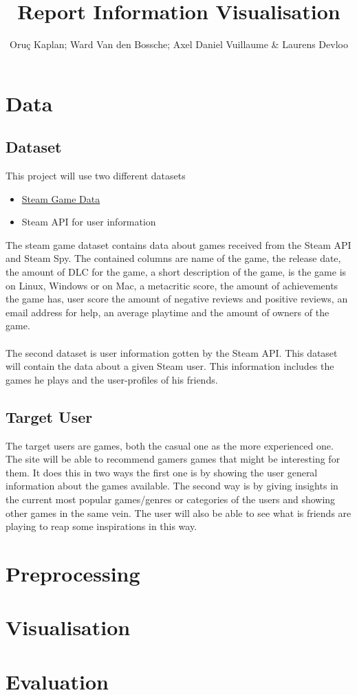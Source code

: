 \documentclass{article}
\begin{document}
	\title{Report Information Visualisation}
	\author{Oruç Kaplan; Ward Van den Bossche; Axel Daniel Vuillaume \& Laurens Devloo}
	\maketitle
	\tableofcontents
	\newpage
	
	\section{Data}
	
	\subsection{Dataset}
	
	This project will use two different datasets
	
	\begin{itemize}
		\item \href{https://www.kaggle.com/datasets/fronkongames/steam-games-dataset/code}{Steam Game Data}
		\item Steam API for user information
	\end{itemize}
	
	The steam game dataset contains data about games received from the Steam API and Steam Spy. The contained columns are name of the game, the release date, the amount of DLC for the game, a short description of the game, is the game is on Linux, Windows or on Mac, a metacritic score, the amount of achievements the game has, user score the amount of negative reviews and positive reviews, an email address for help, an average playtime and the amount of owners of the game.\\
	\\
	The second dataset is user information gotten by the Steam API. This dataset will contain the data about a given Steam user. This information includes the games he plays and the user-profiles of his friends.
	
	\subsection{Target User}
	
	The target users are games, both the casual one as the more experienced one. The site will be able to recommend gamers games that might be interesting for them. It does this in two ways the first one is by showing the user general information about the games available. The second way is by giving insights in the current most popular games/genres or categories of the users and showing other games in the same vein. The user will also be able to see what is friends are playing to reap some inspirations in this way.
	
	\newpage
	
	\section{Preprocessing}
	
	\section{Visualisation}
	
	\section{Evaluation}
	
	
	\newpage
\end{document}

